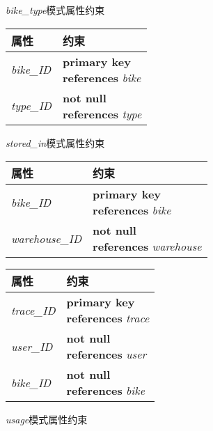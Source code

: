 \begin{figure}[!htp]
    \begin{minipage}{0.3\textwidth}
      \centering
      \caption{\textit{bike\_type}模式属性约束}
      \label{tab:cbiketype}
      \begin{tabular}{ll}\toprule
        属性&约束\\\midrule
       \textit{bike\_ID}&\makecell[l]{\textbf{primary key}\\\textbf{references} \textit{bike}}\\
       \textit{type\_ID}&\makecell[l]{\textbf{not null}\\\textbf{references} \textit{type}}\\
       \bottomrule
      \end{tabular}
    \end{minipage}\hfill
    \begin{minipage}{0.3\textwidth}
      \centering
      \caption{\textit{stored\_in}模式属性约束}
      \label{tab:cstoredin}
      \begin{tabular}{ll}\toprule
        属性&约束\\\midrule
       \textit{bike\_ID}&\makecell[l]{\textbf{primary key}\\\textbf{references} \textit{bike}}\\
       \textit{warehouse\_ID}&\makecell[l]{\textbf{not null}\\\textbf{references} \textit{warehouse}}\\
       \bottomrule
      \end{tabular}
    \end{minipage}\hfill
    \begin{minipage}{0.3\textwidth}
      \centering
      \caption{\textit{usage}模式属性约束}
      \label{tab:cusage}
      \begin{tabular}{ll}\toprule
        属性&约束\\\midrule
       \textit{trace\_ID}&\makecell[l]{\textbf{primary key}\\\textbf{references} \textit{trace}}\\
       \textit{user\_ID}&\makecell[l]{\textbf{not null}\\\textbf{references} \textit{user}}\\
       \textit{bike\_ID}&\makecell[l]{\textbf{not null}\\\textbf{references} \textit{bike}}\\
       \bottomrule
      \end{tabular}
    \end{minipage}\hfill
  \end{figure}
